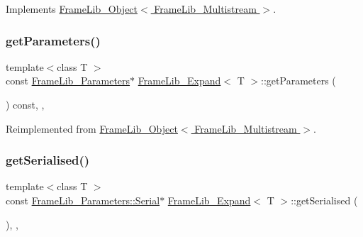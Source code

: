 Implements \hyperlink{class_frame_lib___object_ab34877668c8b6a2ca5efa6bc10368820}{Frame\+Lib\+\_\+\+Object$<$ Frame\+Lib\+\_\+\+Multistream $>$}.

\mbox{\label{class_frame_lib___expand_a7fed62e92c707d454fa49ce10dee39ff}} 
\subsubsection{\texorpdfstring{get\+Parameters()}{getParameters()}}
{\footnotesize\ttfamily template$<$class T $>$ \\
const \hyperlink{class_frame_lib___parameters}{Frame\+Lib\+\_\+\+Parameters}$\ast$ \hyperlink{class_frame_lib___expand}{Frame\+Lib\+\_\+\+Expand}$<$ T $>$\+::get\+Parameters (\begin{DoxyParamCaption}{ }\end{DoxyParamCaption}) const\hspace{0.3cm}{\ttfamily [inline]}, {\ttfamily [override]}, {\ttfamily [virtual]}}



Reimplemented from \hyperlink{class_frame_lib___object_ac90a6770aeef26ee1601889dc16dba56}{Frame\+Lib\+\_\+\+Object$<$ Frame\+Lib\+\_\+\+Multistream $>$}.

\mbox{\label{class_frame_lib___expand_a58eae43d3a0746f20a9d00e9c050b8c8}} 
\subsubsection{\texorpdfstring{get\+Serialised()}{getSerialised()}}
{\footnotesize\ttfamily template$<$class T $>$ \\
const \hyperlink{class_frame_lib___parameters_1_1_serial}{Frame\+Lib\+\_\+\+Parameters\+::\+Serial}$\ast$ \hyperlink{class_frame_lib___expand}{Frame\+Lib\+\_\+\+Expand}$<$ T $>$\+::get\+Serialised (\begin{DoxyParamCaption}{ }\end{DoxyParamCaption})\hspace{0.3cm}{\ttfamily [inline]}, {\ttfamily [override]}, {\ttfamily [virtual]}}



